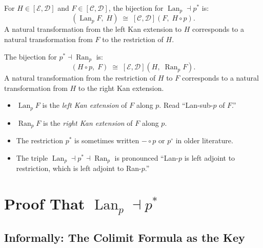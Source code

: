 For $H \in [\mathcal{E}, \mathcal{D}]$ and $F \in [\mathcal{C}, \mathcal{D}]$,
the bijection for $\operatorname{Lan}_p \dashv p^*$ is:
\begin{equation*}
  [\mathcal{E}, \mathcal{D}](\operatorname{Lan}_p F,\; H)
  \;\cong\;
  [\mathcal{C}, \mathcal{D}](F,\; H \circ p).
\end{equation*}
A natural transformation from the left Kan extension to $H$ corresponds to a
natural transformation from $F$ to the restriction of $H$.

The bijection for $p^* \dashv \operatorname{Ran}_p$ is:
\begin{equation*}
  [\mathcal{C}, \mathcal{D}](H \circ p,\; F)
  \;\cong\;
  [\mathcal{E}, \mathcal{D}](H,\; \operatorname{Ran}_p F).
\end{equation*}
A natural transformation from the restriction of $H$ to $F$ corresponds to a
natural transformation from $H$ to the right Kan extension.

\begin{howtosay}
\begin{itemize}
  \item $\operatorname{Lan}_p F$ is the \emph{left Kan extension} of $F$ along $p$.
        Read ``Lan-sub-$p$ of $F$.''
  \item $\operatorname{Ran}_p F$ is the \emph{right Kan extension} of $F$ along $p$.
  \item The restriction $p^*$ is sometimes written $- \circ p$ or $p^\circ$
        in older literature.
  \item The triple $\operatorname{Lan}_p \dashv p^* \dashv \operatorname{Ran}_p$
        is pronounced ``Lan-$p$ is left adjoint to restriction, which is left
        adjoint to Ran-$p$.''
\end{itemize}
\end{howtosay}


\section{Proof That $\operatorname{Lan}_p \dashv p^*$}
\label{sec:lan-adjoint-proof}

\subsection{Informally: The Colimit Formula as the Key}

